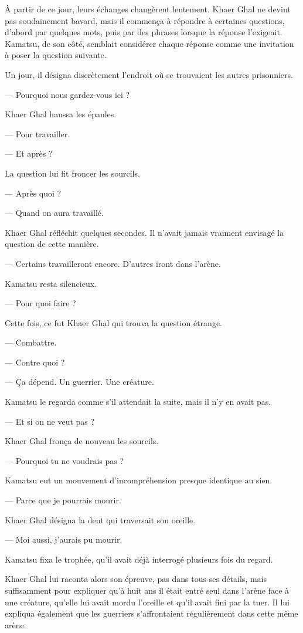 \scenebreak

À partir de ce jour, leurs échanges changèrent lentement. Khaer Ghal ne devint
pas soudainement bavard, mais il commença à répondre à certaines questions,
d'abord par quelques mots, puis par des phrases lorsque la réponse l'exigeait.
Kamatsu, de son côté, semblait considérer chaque réponse comme une invitation à
poser la question suivante.

Un jour, il désigna discrètement l'endroit où se trouvaient les autres
prisonniers.

— Pourquoi nous gardez-vous ici ?

Khaer Ghal haussa les épaules.

— Pour travailler.

— Et après ?

La question lui fit froncer les sourcils.

— Après quoi ?

— Quand on aura travaillé.

Khaer Ghal réfléchit quelques secondes. Il n'avait jamais vraiment envisagé la
question de cette manière.

— Certains travailleront encore. D'autres iront dans l'arène.

Kamatsu resta silencieux.

— Pour quoi faire ?

Cette fois, ce fut Khaer Ghal qui trouva la question étrange.

— Combattre.

— Contre quoi ?

— Ça dépend. Un guerrier. Une créature.

Kamatsu le regarda comme s'il attendait la suite, mais il n'y en avait pas.

— Et si on ne veut pas ?

Khaer Ghal fronça de nouveau les sourcils.

— Pourquoi tu ne voudrais pas ?

Kamatsu eut un mouvement d'incompréhension presque identique au sien.

— Parce que je pourrais mourir.

Khaer Ghal désigna la dent qui traversait son oreille.

— Moi aussi, j'aurais pu mourir.

Kamatsu fixa le trophée, qu'il avait déjà interrogé plusieurs fois du regard.

Khaer Ghal lui raconta alors son épreuve, pas dans tous ses détails, mais
suffisamment pour expliquer qu'à huit ans il était entré seul dans l'arène face
à une créature, qu'elle lui avait mordu l'oreille et qu'il avait fini par la
tuer. Il lui expliqua également que les guerriers s'affrontaient régulièrement
dans cette même arène.

